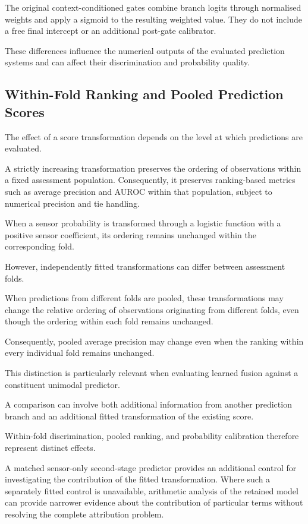 The original context-conditioned gates combine branch logits through normalised weights and apply a sigmoid to the resulting weighted value. They do not include a free final intercept or an additional post-gate calibrator.

These differences influence the numerical outputs of the evaluated prediction systems and can affect their discrimination and probability quality.

\subsection{Within-Fold Ranking and Pooled Prediction Scores}

The effect of a score transformation depends on the level at which predictions are evaluated.

A strictly increasing transformation preserves the ordering of observations within a fixed assessment population. Consequently, it preserves ranking-based metrics such as average precision and AUROC within that population, subject to numerical precision and tie handling.

When a sensor probability is transformed through a logistic function with a positive sensor coefficient, its ordering remains unchanged within the corresponding fold.

However, independently fitted transformations can differ between assessment folds.

When predictions from different folds are pooled, these transformations may change the relative ordering of observations originating from different folds, even though the ordering within each fold remains unchanged.

Consequently, pooled average precision may change even when the ranking within every individual fold remains unchanged.

This distinction is particularly relevant when evaluating learned fusion against a constituent unimodal predictor.

A comparison can involve both additional information from another prediction branch and an additional fitted transformation of the existing score.

Within-fold discrimination, pooled ranking, and probability calibration therefore represent distinct effects.

A matched sensor-only second-stage predictor provides an additional control for investigating the contribution of the fitted transformation. Where such a separately fitted control is unavailable, arithmetic analysis of the retained model can provide narrower evidence about the contribution of particular terms without resolving the complete attribution problem.

